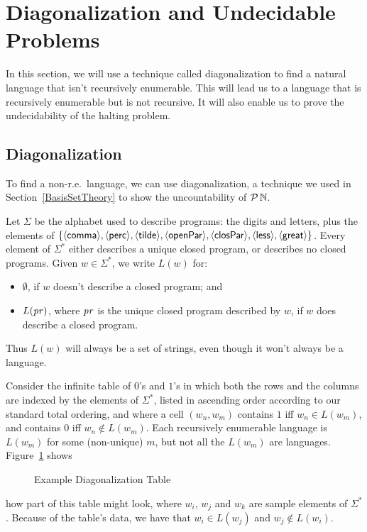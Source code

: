 \section{Diagonalization and Undecidable Problems}
\label{DiagonalizationAndUndecidableProblems}

In this section, we will use a technique called diagonalization to
find a natural language that isn't recursively enumerable.  This will
lead us to a language that is recursively enumerable but is not
recursive.  It will also enable us to prove the undecidability of the
halting problem.

\subsection{Diagonalization}

To find a non-r.e.\ language, we can use diagonalization, a technique
we used in Section~\ref{BasisSetTheory} to show the uncountability of
${\cal P} \,\mathbb{N}$.

Let $\Sigma$ be the alphabet used to describe programs: the digits and
letters, plus the elements of $\{{\langle\mathsf{comma}\rangle}, {\langle\mathsf{perc}\rangle}, {\langle\mathsf{tilde}\rangle},
{\langle\mathsf{openPar}\rangle}, {\langle\mathsf{closPar}\rangle}, {\langle\mathsf{less}\rangle}, {\langle\mathsf{great}\rangle}\}$.  Every element of
$\Sigma^*$ either describes a unique closed program, or describes no
closed programs.  Given $w\in\Sigma^*$, we write $L(w)$ for:
\begin{itemize}
\item $\emptyset$, if $w$ doesn't describe a closed program; and

\item $L(\mathit{pr})$, where $\mathit{pr}$ is the unique closed program described by
  $w$, if $w$ does describe a closed program.
\end{itemize}
Thus $L(w)$ will always be a set of strings, even though it won't
always be a language.

Consider the infinite table of $0$'s and $1$'s in which both the rows
and the columns are indexed by the elements of $\Sigma^*$, listed in
ascending order according to our standard total ordering, and where a
cell $(w_n, w_m)$ contains $1$ iff $w_n\in L(w_m)$, and contains $0$
iff $w_n\not\in L(w_m)$.
Each recursively enumerable language is $L(w_m)$ for some (non-unique)
$m$, but not all the $L(w_m)$ are languages.
Figure~\ref{DiagTable} shows
\begin{figure}
\begin{center}

\end{center}
\caption{Example Diagonalization Table}
\label{DiagTable}
\end{figure}
how part of this table might look, where $w_i$, $w_j$ and $w_k$ are
sample elements of $\Sigma^*$.  Because of the table's data, we have
that $w_i\in L(w_j)$ and $w_j\not\in L(w_i)$.

